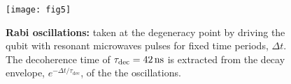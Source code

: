   \begin{figure}[h]
    \texttt{[image: fig5]}
    \caption{\textbf{Rabi oscillations:}  taken at the  degeneracy point by driving  the qubit
      with resonant microwaves pulses  for fixed time periods, $ \Delta t  $.  The decoherence time
      of  $  \tau_{\text{dec}}  =  42\,\text{ns}  $   is  extracted  from  the  decay  envelope,
      $ e^{-\Delta t/\tau_{\text{dec}}} $, of the the oscillations. \label{fig:rabi}}
  \end{figure}

